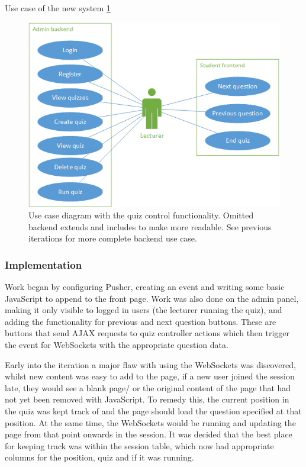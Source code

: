 Use case of the new system \ref{fig:iter-4-use-case}
\begin{figure}
	\caption{Use case diagram with the quiz control functionality. Omitted backend extends and includes to make more readable. See previous iterations for more complete backend use case.}
	\centerline{\includegraphics{Chapter2/Iter-4/iter-4-use-case}}
	\label{fig:iter-4-use-case}
\end{figure}

\subsubsection{Implementation}
Work began by configuring Pusher, creating an event and writing some basic JavaScript to append to the front page. Work was also done on the admin panel, making it only visible to logged in users (the lecturer running the quiz), and adding the functionality for previous and next question buttons. These are buttons that send AJAX requests to quiz controller actions which then trigger the event for WebSockets with the appropriate question data.

Early into the iteration a major flaw with using the WebSockets was discovered, whilst new content was easy to add to the page, if a new user joined the session late, they would see a blank page/ or the original content of the page that had not yet been removed with JavaScript. To remedy this, the current position in the quiz was kept track of and the page should load the question specified at that position. At the same time, the WebSockets would be running and updating the page from that point onwards in the session. It was decided that the best place for keeping track was within the session table, which now had appropriate columns for the position, quiz and if it was running.

